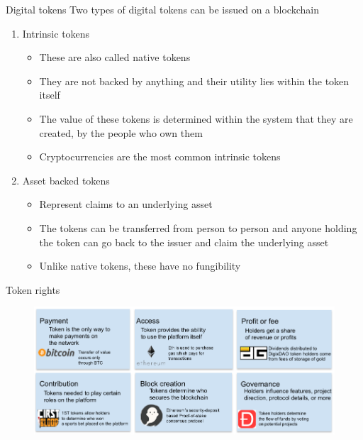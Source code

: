 \documentclass[11pt]{beamer}
\begin{document}

\begin{frame}{Digital tokens}
	Two types of digital tokens can be issued on a blockchain
	\begin{enumerate}
		\item Intrinsic tokens
			\begin{itemize}
				\item These are also called native tokens
				\item They are not backed by anything and their utility lies within the token itself
				\item The value of these tokens is determined within the system that they are created, by the people who own them
				\item Cryptocurrencies are the most common intrinsic tokens
			\end{itemize}
		\item Asset backed tokens
			\begin{itemize}
				\item Represent claims to an underlying asset
				\item The tokens can be transferred from person to person and anyone holding the token can go back to the issuer and claim the underlying asset
				\item Unlike native tokens, these have no fungibility
			\end{itemize}
	\end{enumerate}
\end{frame}


\begin{frame}{Token rights}
	\begin{figure}[]
		\centering
		\includegraphics  [scale=0.35]{Images/token-rights}
	\end{figure}
\end{frame}
\end{document}
